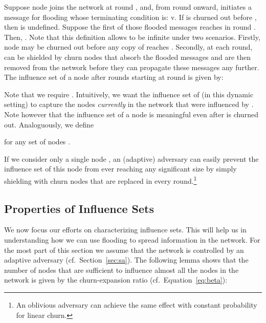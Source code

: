 \documentclass[leqno,11pt]{article}
\begin{document}
Suppose node  joins the network at round , and,
from round  onward,  initiates a message  for flooding whose
terminating condition is: {\sc v}. If  is churned out before
, then  is undefined. Suppose  the first of those flooded
messages reaches  in round . Then, .
Note that this definition allows  to be infinite under two
scenarios. Firstly, node  may be churned out before any copy of  reaches
. Secondly, at each round,  can be shielded by churn nodes that absorb the
flooded messages and are then removed from the network before they can propagate
these messages any further. The influence set of a node  after  rounds
starting at round  is given by: 

Note that we require  . Intuitively, we want
the influence set of  (in this dynamic setting) to capture the nodes
\emph{currently} in the network that were influenced by .
Note however  that the influence set of a node  is meaningful even after  is churned out.
Analoguously, we define 

for any set of nodes .


If we consider only a single node , an (adaptive) adversary can easily prevent the
influence set of this node from ever reaching any significant size by simply
shielding  with churn nodes that are replaced in every round.\footnote{An
oblivious adversary can achieve the same effect with constant probability for
linear churn.}  


\subsection{Properties of Influence Sets}
We now focus our efforts on characterizing influence sets. This will help us in understanding how we can use flooding to spread information in the network.
For the most part of this section we assume that the network is controlled by an
adaptive adversary (cf.\ Section~\ref{sec:sa}).
The following lemma shows that the number of nodes that are sufficient to influence almost all the nodes in the network is given by the churn-expansion ratio (cf.\ Equation\ \eqref{eq:beta}):
\end{document}
